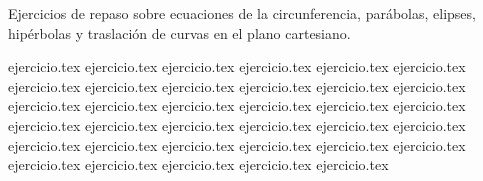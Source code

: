 
Ejercicios de repaso sobre ecuaciones de la circunferencia, parábolas, elipses, hipérbolas y traslación de curvas en el plano cartesiano.

\begin{enumerate}
    \setcounter{enumi}{5}
    {ejercicio.tex}
    {ejercicio.tex}
    {ejercicio.tex}
    {ejercicio.tex}
    {ejercicio.tex}
    \setcounter{enumi}{10}
    {ejercicio.tex}
    {ejercicio.tex}
    {ejercicio.tex}
    {ejercicio.tex}
    {ejercicio.tex}
    {ejercicio.tex}
    {ejercicio.tex}
    {ejercicio.tex}
    {ejercicio.tex}
    {ejercicio.tex}
    {ejercicio.tex}
    {ejercicio.tex}
    \setcounter{enumi}{22}
    {ejercicio.tex}
    {ejercicio.tex}
    {ejercicio.tex}
    {ejercicio.tex}
    {ejercicio.tex}
    {ejercicio.tex}
    {ejercicio.tex}
    {ejercicio.tex}
    {ejercicio.tex}
    {ejercicio.tex}
    \setcounter{enumi}{32}
    {ejercicio.tex}
    {ejercicio.tex}
    {ejercicio.tex}
    {ejercicio.tex}
    \setcounter{enumi}{36}
    {ejercicio.tex}
    {ejercicio.tex}
    {ejercicio.tex}
    {ejercicio.tex}
\end{enumerate}
